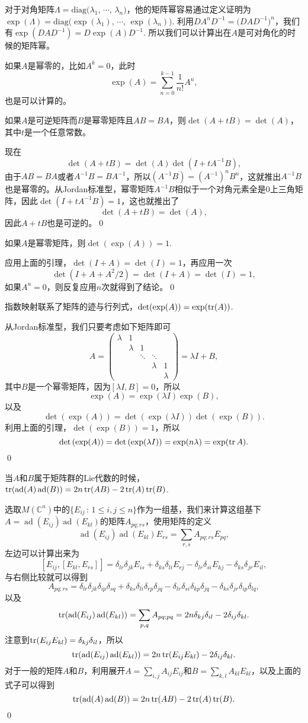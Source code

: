 \documentclass[10pt]{article}
\newcommand{\cc}{\mathbb{C}}
\DeclareMathOperator{\ad}{ad}
\begin{document}
对于对角矩阵$\Lambda=\mathrm{diag}(\lambda_1$, $\cdots$, $\lambda_n)$，他的矩阵幂容易通过定义证明为$\exp(\Lambda)=\mathrm{diag}(\exp(\lambda_1)$, $\cdots$, $\exp(\lambda_n))$. 利用$DA^nD^{-1}=\bigl(DAD^{-1}\bigr)^n$，我们有$\exp(DAD^{-1})=D\exp(A)D^{-1}$. 所以我们可以计算出在$A$是可对角化的时候的矩阵幂。

如果$A$是幂零的，比如$A^k=0$，此时
\[
	\exp(A)=\sum_{n=0}^{k-1} \frac{1}{n!}A^n,
\]
也是可以计算的。

\lem 如果$A$是可逆矩阵而$B$是幂零矩阵且$AB=BA$，则$\det(A+tB)=\det(A)$，其中$t$是一个任意常数。

\proof 现在
\[
	\det(A+tB)=\det(A)\det(I+tA^{-1}B),
\]
由于$AB=BA$或者$A^{-1}B=BA^{-1}$，所以$(A^{-1}B)=(A^{-1})^n B^n$，这就推出$A^{-1}B$也是幂零的。从Jordan标准型，幂零矩阵$A^{-1}B$相似于一个对角元素全是$0$上三角矩阵，因此$\det(I+tA^{-1}B)=1$，这也就推出了
\[
	\det(A+tB)=\det(A),
\]
因此$A+tB$也是可逆的。\qed

\lem 如果$A$是幂零矩阵，则$\det(\exp(A))=1$.

\proof 应用上面的引理，$\det(I+A)=\det(I)=1$，再应用一次
\[
	\det(I+A+A^2/2)=\det(I+A)=\det(I)=1,
\]
如果$A^n=0$，则反复应用$n$次就得到了结论。\qed

\pro 指数映射联系了矩阵的迹与行列式，$\det(\exp(A))=\exp(\operatorname{tr}(A))$.

\proof 从Jordan标准型，我们只要考虑如下矩阵即可
\[
	A=\begin{pmatrix}
	\lambda &1&&&\\
	&\lambda&1&&\\
	&&\ddots&\ddots&\\
	&&&\lambda&1\\
	&&&&\lambda
	\end{pmatrix}=\lambda I+ B,
\]
其中$B$是一个幂零矩阵，因为$[\lambda I,B]=0$，所以
\[
	\exp(A)=\exp(\lambda I)\exp(B),
\]
以及
\[
	\det \left(\exp(A)\right)=\det\left(\exp(\lambda I)\right)\det\left(\exp(B)\right).
\]
利用上面的引理，$\det\left(\exp(B)\right)=1$，所以
\[
\det \left(\exp(A)\right)=\det\left(\exp(\lambda I)\right)=\exp(n\lambda)=\exp(\operatorname{tr} A).
\]
\qed

\pro 当$A$和$B$属于矩阵群的Lie代数的时候，$\tr(\ad(A)\ad(B))=2n \tr(AB) -2\tr(A)\tr(B)$.

\proof 选取$M(\cc^n)$中的$\{E_{ij}\,:\, 1\leq i,j\leq n\}$作为一组基，我们来计算这组基下$A=\ad(E_{ij})\ad(E_{kl})$的矩阵$A_{pq;rs}$，使用矩阵的定义
\[
\ad(E_{ij})\ad(E_{kl})E_{rs}=\sum_{r,s}A_{pq;rs}E_{pq},
\]
左边可以计算出来为
\[
[E_{ij},[E_{kl},E_{rs}]]=\delta_{lr}\delta_{jk}E_{is}+\delta_{ks}\delta_{li}E_{rj}-\delta_{lr}\delta_{si}E_{kj}-\delta_{ks}\delta_{jr}E_{il},
\]
与右侧比较就可以得到
\[
	A_{pq;rs}=\delta_{lr}\delta_{jk}\delta_{ip}\delta_{sq}+\delta_{ks}\delta_{li}\delta_{rp}\delta_{jq}-\delta_{lr}\delta_{si}\delta_{kp}\delta_{jq}-\delta_{ks}\delta_{jr}\delta_{ip}\delta_{lq},
\]
以及
\[
	\tr(\ad(E_{ij})\ad(E_{kl}))=\sum_{p,q}A_{pq;pq}=2n \delta_{kj}\delta_{il}-2\delta_{ij}\delta_{kl}.
\]
注意到$\operatorname{tr}(E_{ij}E_{kl})=\delta_{kj}\delta_{il}$，所以
\[
\tr(\ad(E_{ij})\ad(E_{kl}))=2n \tr(E_{ij}E_{kl}) -2\delta_{ij}\delta_{kl}.
\]
对于一般的矩阵$A$和$B$，利用展开$A=\sum_{i,j}A_{ij}E_{ij}$和$B=\sum_{k,l}A_{kl}E_{kl}$，以及上面的式子可以得到
\[
\tr(\ad(A)\ad(B))=2n \tr(AB) -2\tr(A)\tr(B).
\]\qed
\end{document}
